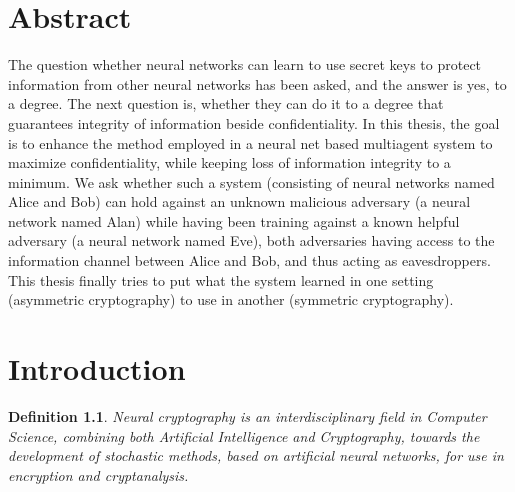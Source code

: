 \documentclass[a4paper, 12pt]{report}
\newtheorem{definition}{Definition}
\begin{document}
\chapter*{Abstract}
\begin{center}
	\begin{minipage}{0.8\textwidth}
			\justify
			The question whether neural networks can learn to use secret keys to protect information from other neural networks has been asked, and the answer is yes, to a degree. 
			The next question is, whether they can do it to a degree that guarantees integrity of information beside confidentiality.
			In this thesis, the goal is to enhance the method employed in a neural net based multiagent system to maximize confidentiality, while keeping loss of information integrity to a minimum. We ask whether such a system (consisting of neural networks named Alice and Bob) can hold against an unknown malicious adversary (a neural network named Alan) while having been training against a known helpful adversary (a neural network named Eve), both adversaries having access to the information channel between Alice and Bob, and thus acting as eavesdroppers.
			This thesis finally tries to put what the system learned in one setting (asymmetric cryptography) to use in another (symmetric cryptography).
	\end{minipage}
\end{center}
\newpage
\begin{spacing}{0.05}
\tableofcontents
\end{spacing}
\newpage
\chapter{Introduction}\label{sec:introduction}
\begin{definition}
	Neural cryptography is an interdisciplinary field in Computer Science, combining both Artificial Intelligence and Cryptography, towards the development of stochastic methods, based on artificial neural networks, for use in encryption and cryptanalysis.
\end{definition}
\end{document}
